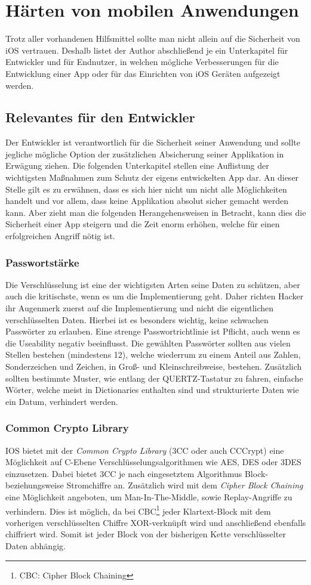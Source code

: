 \section{Härten von mobilen Anwendungen}
	Trotz aller vorhandenen Hilfsmittel sollte man nicht allein auf die Sicherheit
	von iOS vertrauen. Deshalb listet der Author abschließend je ein Unterkapitel
	für Entwickler und für Endnutzer, in welchen mögliche Verbesserungen für die
	Entwicklung einer App oder für das Einrichten von iOS Geräten aufgezeigt
	werden.
	\subsection{Relevantes für den Entwickler}
		Der Entwickler ist verantwortlich für die Sicherheit seiner Anwendung und
		sollte jegliche mögliche Option der zusätzlichen Absicherung seiner
		Applikation in Erwägung ziehen. Die folgenden Unterkapitel stellen eine
		Auflistung der wichtigsten Maßnahmen zum Schutz der eigens entwickelten App
		dar. An dieser Stelle gilt es zu erwähnen, dass es sich hier nicht um nicht
		alle Möglichkeiten handelt und vor allem, dass keine Applikation absolut
		sicher gemacht werden kann. Aber zieht man die folgenden Herangehensweisen in
		Betracht, kann dies die Sicherheit einer App steigern und die
		Zeit enorm erhöhen, welche für einen erfolgreichen Angriff nötig ist.
		\subsubsection{Passwortstärke}
			Die Verschlüsselung ist eine der wichtigsten Arten seine Daten zu schützen,
			aber auch die kritischste, wenn es um die Implementierung geht. Daher richten
			Hacker ihr Augenmerk zuerst auf die Implementierung und nicht die
			eigentlichen verschlüsselten Daten. Hierbei ist es besonders wichtig, keine
			schwachen Passwörter zu erlauben. Eine strenge Passwortrichtlinie ist
			Pflicht, auch wenn es die Useability negativ beeinflusst. Die gewählten
			Passwörter sollten aus vielen Stellen bestehen (mindestens 12),
			welche wiederrum zu einem Anteil aus Zahlen, Sonderzeichen und Zeichen, in
			Groß- und Kleinschreibweise, bestehen. Zusätzlich sollten bestimmte Muster,
			wie entlang der QUERTZ-Tastatur zu fahren, einfache Wörter, welche meist in
			Dictionaries enthalten sind und strukturierte Daten wie ein Datum, verhindert
			werden.
		\subsubsection{Common Crypto Library}\label{sec:3cc}
			IOS bietet mit der \textsl{Common Crypto Library}\cite{3CC2007}
			(3CC oder auch CCCrypt) eine Möglichkeit auf C-Ebene 
			Verschlüsselungsalgorithmen wie AES, DES oder 3DES einzusetzen. Dabei bietet
			3CC je nach eingesetztem Algorithmus Block- beziehungsweise Stromchiffre an.
			Zusätzlich wird mit dem \textsl{Cipher Block Chaining} eine
			Möglichkeit angeboten, um Man-In-The-Middle, sowie Replay-Angriffe zu
			verhindern. Dies ist möglich, da bei CBC\footnote{CBC: Cipher Block Chaining}
			jeder Klartext-Block mit dem vorherigen verschlüsselten Chiffre
			XOR-verknüpft wird und anschließend ebenfalls chiffriert wird. Somit ist
			jeder Block von der bisherigen Kette verschlüsselter Daten abhängig.
